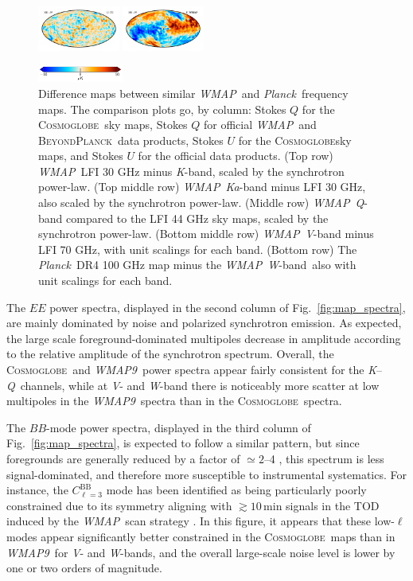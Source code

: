 \documentclass[twocolumn]{../../common/aa}
\def\WMAP{\emph{WMAP}}
\def\WMAPnine{\emph{WMAP9}}
\def\Planck{\emph{Planck}}
\newcommand{\BP}{\textsc{BeyondPlanck}}
\newcommand{\cosmoglobe}{\textsc{Cosmoglobe}}
\newcommand{\K}[0]{\textit K}
\newcommand{\Ka}[0]{\textit{Ka}}
\newcommand{\Q}[0]{\textit Q}
\newcommand{\V}[0]{\textit V}
\newcommand{\W}[0]{\textit W}
\begin{document}
\begin{figure}
	\includegraphics[width=0.24\textwidth]{figures/100W_deltaU.pdf}
	\includegraphics[width=0.24\textwidth]{figures/100W_W_deltaU.pdf}
	
        \includegraphics[width=0.25\textwidth]{figures/cbar_10uK.pdf}
	\caption{Difference maps between similar \WMAP\ and \Planck\ frequency maps. The comparison plots go, by column: Stokes $Q$ for the \cosmoglobe\ sky maps, Stokes $Q$ for official \WMAP\ and \BP\ data products, Stokes $U$ for the \cosmoglobe sky maps, and Stokes $U$ for the official data products. (Top row) \WMAP\ LFI 30 GHz minus \K-band, scaled by the synchrotron power-law. (Top middle row) \WMAP\ \Ka-band minus LFI 30 GHz, also scaled by the synchrotron power-law. (Middle row) \WMAP\ \Q-band compared to the LFI 44 GHz sky maps, scaled by the synchrotron power-law. (Bottom middle row) \WMAP\ \V-band minus LFI 70 GHz, with unit scalings for each band. (Bottom row) The \Planck\ DR4 100 GHz map minus the \WMAP\ \W-band\, also with unit scalings for each band.}
	\label{fig:wmap_lfi_compare}
\end{figure}

The $EE$ power spectra, displayed in the second column of Fig.~\ref{fig:map_spectra}, are mainly dominated by noise and polarized synchrotron emission. As expected, the large scale foreground-dominated multipoles decrease in amplitude according to the relative amplitude of the synchrotron spectrum. Overall, the \cosmoglobe\ and \WMAPnine\ power spectra appear fairly consistent for the \K--\Q\ channels, while at \V- and \W-band there is noticeably more scatter at low multipoles in the \WMAPnine\ spectra than in the \cosmoglobe\ spectra.%

The $BB$-mode power spectra, displayed in the third column of Fig.~\ref{fig:map_spectra}, is expected to follow a similar pattern, but since foregrounds are generally reduced by a factor of $\simeq2$--4 \citep{bennett2012,planck2016-l04}, this spectrum is less signal-dominated, and therefore more susceptible to instrumental systematics. For instance, the $C_{\ell=3}^\mathrm{BB}$ mode has been identified as being particularly poorly constrained due to its symmetry aligning with $\gtrsim10\,\mathrm{min}$ signals in the TOD induced by the \WMAP\ scan strategy \citep[e.g.,][]{jarosik2010}. In this figure, it appears that these low-$\ell$ modes appear significantly better constrained in the \cosmoglobe\ maps than in \WMAPnine\ for \V- and \W-bands, and the overall large-scale noise level is lower by one or two orders of magnitude. 
\end{document}
